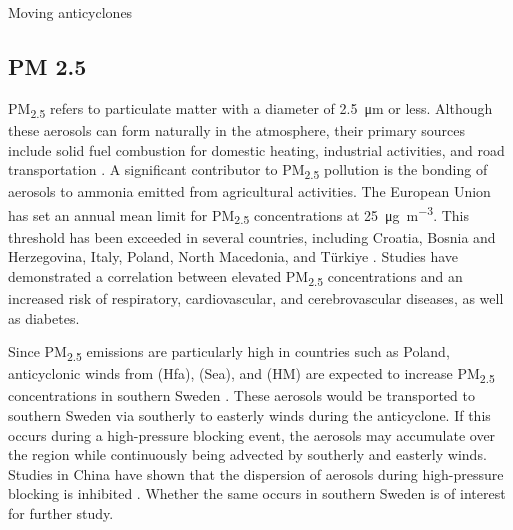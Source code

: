 Moving anticyclones

\subsection{PM 2.5}
PM\textsubscript{2.5} refers to particulate matter with a diameter of \SI{2.5}{\micro\meter} or less. Although these aerosols can form naturally in the atmosphere, their primary sources include solid fuel combustion for domestic heating, industrial activities, and road transportation \cite{EuropesAirQuality}. A significant contributor to PM\textsubscript{2.5} pollution is the bonding of aerosols to ammonia emitted from agricultural activities. The European Union has set an annual mean limit for PM\textsubscript{2.5} concentrations at \SI{25}{\micro\gram\per\cubic\meter}. This threshold has been exceeded in several countries, including Croatia, Bosnia and Herzegovina, Italy, Poland, North Macedonia, and Türkiye \cite{EuropesAirQuality}. Studies have demonstrated a correlation between elevated PM\textsubscript{2.5} concentrations and an increased risk of respiratory, cardiovascular, and cerebrovascular diseases, as well as diabetes.

Since PM\textsubscript{2.5} emissions are particularly high in countries such as Poland, anticyclonic winds from (Hfa), (Sea), and (HM) are expected to increase PM\textsubscript{2.5} concentrations in southern Sweden \cite{EuropesAirQuality}. These aerosols would be transported to southern Sweden via southerly to easterly winds during the anticyclone. If this occurs during a high-pressure blocking event, the aerosols may accumulate over the region while continuously being advected by southerly and easterly winds. Studies in China have shown that the dispersion of aerosols during high-pressure blocking is inhibited \cite{caiImpactBlockingStructure2020}. Whether the same occurs in southern Sweden is of interest for further study.
